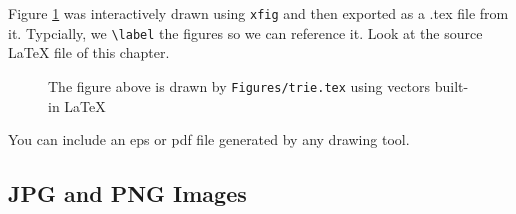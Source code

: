 Figure \ref{trie} was interactively drawn using {\tt xfig} and then
exported as a .tex file from it.  Typcially, we \verb|\label| the
figures so we can reference it.  Look at the source \LaTeX{} file of
this chapter.

\begin{figure}[ht]\centering

\caption{The figure above is drawn by {\tt Figures/trie.tex} using
  vectors built-in \LaTeX{}}\label{trie}
\end{figure}

You can include an eps or pdf file generated by any drawing tool.

\subsection{JPG and PNG Images}

